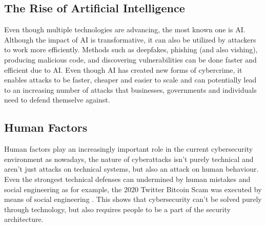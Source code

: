 \documentclass[12pt]{article}
\begin{document}
\subsection{The Rise of Artificial Intelligence}
Even though multiple technologies are advancing, the most known one is AI. Although the impact of AI is transformative, it can also be utilized by attackers to work more efficiently. Methods such as deepfakes, phishing (and also vishing), producing malicious code, and discovering vulnerabilities can be done faster and efficient due to AI. Even though AI has created new forms of cybercrime, it enables attacks to be faster, cheaper and easier to scale and can potentially lead to an increasing number of attacks that businesses, governments and individuals need to defend themselve against.
\subsection{Human Factors}
Human factors play an increasingly important role in the current cybersecurity environment as nowadays, the nature of cyberattacks isn’t purely technical and aren’t just attacks on technical systems, but also an attack on human behaviour. Even the strongest technical defenses can undermined by human mistakes and social engineering as for example, the 2020 Twitter Bitcoin Scam was executed by means of social engineering \cite{twitterhack}.
\newline
This shows that cybersecurity can't be solved purely through technology, but also requires people to be a part of the security architecture.
\end{document}
